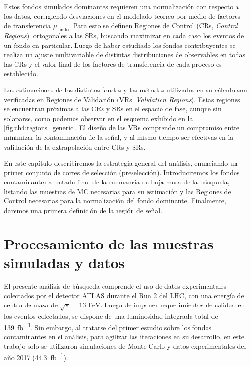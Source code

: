 Estos fondos simulados dominantes requieren una normalización con respecto a los datos, corrigiendo desviaciones en el modelado teórico por medio de factores de transferencia $\mu_{\text{fondo}}$. Para esto se definen Regiones de Control (CRs, \textit{Control Regions}), ortogonales a las SRs, buscando maximizar en cada caso los eventos de un fondo en particular. Luego de haber estudiado los fondos contribuyentes se realiza un ajuste multivariable de distintas distribuciones de observables en todas las CRs y el valor final de los factores de transferencia de cada proceso es establecido.

Las estimaciones de los distintos fondos y los métodos utilizados en su cálculo son verificadas en Regiones de Validación (VRs, \textit{Validation Regions}). Estas regiones se encuentran próximas a las CRs y SRs en el espacio de fase, aunque sin solaparse, como podemos observar en el esquema exhibido en la \cref{fig:ch4:regions_generic}. El diseño de las VRs comprende un compromiso entre minimizar la contaminación de la señal, y al mismo tiempo ser efectivas en la validación de la extrapolación entre CRs y SRs.

En este capítulo describiremos la estrategia general del análisis, enunciando un primer conjunto de cortes de selección (preselección). Introduciremos los fondos contaminantes al estado final de la resonancia de baja masa de la búsqueda, listando las muestras de MC necesarias para su estimación y las Regiones de Control necesarias para la normalización del fondo dominante. Finalmente, daremos una primera definición de la región de señal.


\section{Procesamiento de las muestras simuladas y datos} \label{sec:ch4:processing}

El presente análisis de búsqueda comprende el uso de datos experimentales colectados por el detector ATLAS durante el Run 2 del LHC, con una energía de centro de masa de $\sqrt{s} = \SI{13}{\TeV}$. Luego de imponer requerimientos de calidad en los eventos colectados, se dispone de una luminosidad integrada total de \SI{139}{\femto\barn^{-1}}. Sin embargo, al tratarse del primer estudio sobre los fondos contaminantes en el análisis, para agilizar las iteraciones en su desarrollo, en este trabajo solo se utilizaron simulaciones de Monte Carlo y datos experimentales del año 2017 (\SI{44.3}{\femto\barn^{-1}}).

